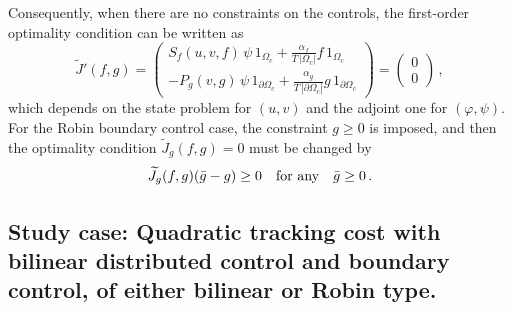 \documentclass[11pt]{article}
\numberwithin{theorem}{section}
\begin{document}
 Consequently, when there are no constraints  on the controls, the first-order  optimality condition can be written as
$$
\widetilde J' (f,g) =
\left(
\begin{array}{c}
  S_f(u,v,f) \, \psi \, 1_{\Omega_c}+ \frac{\alpha_f}{T\, |\Omega_c|} f   \, 1_{\Omega_c}
   \\
   - P_g(v,g) \, \psi \, 1_{\partial\Omega_c} + \frac{\alpha_g}{T\, |\partial\Omega_c|} g \, 1_{\partial\Omega_c}
\end{array}
\right)
=
\left(
\begin{array}{c}
  0
   \\
 0
\end{array}
\right)\,,
$$
which depends on the state problem for $(u,v)$ and the adjoint one for $(\varphi,\psi)$. 
For the Robin boundary control  case,  the  constraint  $g\ge 0$ is imposed, and then the optimality condition $\widetilde J_g(f,g)=0$ must be changed by  
$$
\widetilde J_g(f,g)(\bar g -g)\ge 0\quad \hbox{for any} \quad \bar g\ge 0\,.
$$



 \subsection{Study case:  Quadratic tracking cost with  bilinear distributed control  and boundary control, of either bilinear or Robin type.}
 
\end{document}
